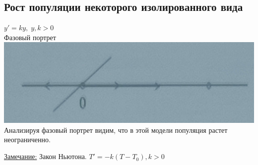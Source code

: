 \documentclass[12pt]{article}
\let\ORIincludegraphics\includegraphics
\renewcommand{\includegraphics}[2][]{\ORIincludegraphics[scale=0.65,#1]{#2}}
\begin{document}
  \subsection*{Рост популяции некоторого изолированного вида}
  \begin{center}
    $y'=ky, \; y,k>0$\\
    Фазовый портрет\\
    \includegraphics[scale=0.7]{"1.4.1.png"}\\
    Анализируя фазовый портрет видим, что в этой модели популяция растет неограниченно.\\  
  \end{center}
  \underline{Замечание:} Закон Ньютона. $T'=-k(T-T_0),k>0$
\end{document}
